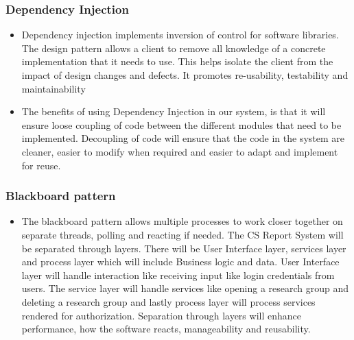 \documentclass{article}
\begin{document}
            \subsubsection{Dependency Injection} %
            
             \begin{itemize}
          \item  Dependency injection implements inversion of control for software libraries. The design pattern 					allows a client to remove all knowledge of a concrete implementation that it needs to use. This helps 					isolate the client from the impact of design changes and defects. It promotes re-usability, testability 					and maintainability
        	\item The benefits of using Dependency Injection in our system, is that it will ensure loose coupling of 				code between the diﬀerent modules that need to be implemented. Decoupling of code will ensure that the 					code in the system are cleaner, easier to modify when required and easier to adapt and implement for reuse.	
           \end{itemize} 
           
           
           \subsubsection{Blackboard pattern} %
            
             \begin{itemize}
          \item  The blackboard pattern allows multiple processes to work closer together on separate threads, 						polling and reacting if needed. The CS Report System will be separated through layers. There will be User 			Interface layer, services layer and process layer which will include Business logic and data.  User	 					Interface layer will handle interaction like receiving input like login credentials from users. The 						service layer will handle services like opening a research group and deleting a research group and lastly 			process layer will process services rendered for authorization. Separation through layers will enhance 					performance, how the software reacts,  manageability and reusability.
        	
           \end{itemize} 
           
         
           
\end{document}
